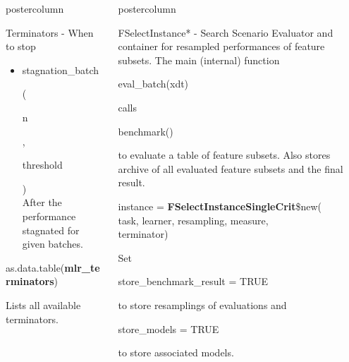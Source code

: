 \documentclass{beamer}
\newlength{\columnheight} %
\newcommand{\codeinline}[1]{\begin{codeboxinline}#1\end{codeboxinline}}
\begin{document}
\begin{frame}[fragile]{}
\begin{columns}
\begin{column}{.245\textwidth}
\begin{beamercolorbox}[center]{postercolumn}
\begin{minipage}{.98\textwidth}
{\begin{myblock}{Terminators - When to stop}
\begin{itemize}
							(\codeinline{iters}, \codeinline{threshold})\\
							After the performance stagnated for given iterations.
							\item \codeinline{stagnation\_batch}
							(\codeinline{n}, \codeinline{threshold})\\
							After the performance stagnated for given batches.
						\end{itemize}
						\vspace{1em}
						\begin{codebox}
							as.data.table(\textbf{mlr\_terminators})
						\end{codebox}
						Lists all available terminators.
					\end{myblock}
						\vfill}
				\end{minipage}
			\end{beamercolorbox}
		\end{column}
		\begin{column}{.245\textwidth}
			\begin{beamercolorbox}[center]{postercolumn}
				\begin{minipage}{.98\textwidth}
					\parbox[t][\columnheight]{\textwidth}{
						\begin{myblock}{FSelectInstance* - Search Scenario}
							Evaluator and container for resampled performances of feature subsets.
							The main (internal) function \codeinline{eval\_batch(xdt)} calls \codeinline{benchmark()} to evaluate a table of feature subsets. 
							Also stores archive of all evaluated feature subsets and the final result.
							\\
							\begin{codeboxmultiline}[width=25cm]
								instance = \textbf{FSelectInstanceSingleCrit}\$new(\\
								\hspace*{1ex}task, learner, resampling, measure,\\
								terminator)
							\end{codeboxmultiline}
							Set \codeinline{store\_benchmark\_result = TRUE} to store resamplings of evaluations and \codeinline{store\_models = TRUE} to store associated models.\\

\end{myblock}}
\end{minipage}
\end{beamercolorbox}
\end{column}
\end{columns}
\end{frame}
\end{document}
